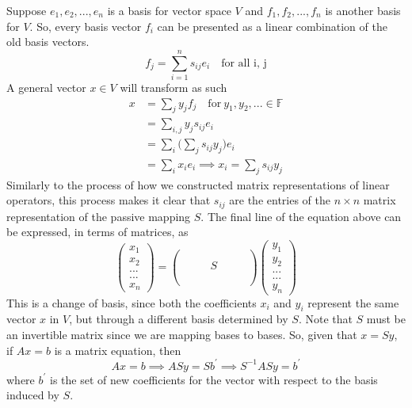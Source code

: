 \documentclass{article}
\theoremstyle{remark}
\theoremstyle{definition}
\begin{document}
    Suppose ${e_1, e_2, ..., e_n}$ is a basis for vector space $V$ and ${f_1, f_2, ..., f_n}$ is another basis for $V$. So, every basis vector $f_i$ can be presented as a linear combination of the old basis vectors. 
    \[f_j = \sum_{i =1}^{n} s_{i j} e_i \quad \text{for all i, j}\]
    A general vector $x \in V$ will transform as such
    \begin{equation} \label{eq1}
    \begin{split}
    x & = \sum_{j} y_j f_j \quad \text{for} \ y_{1}, y_{2}, ... \in \mathbb{F} \\
     & = \sum_{i,j} y_j s_{i j} e_i \\
     & = \sum_{i} \Big( \sum_{j} s_{i j} y_j \Big) e_i \\
     & = \sum_{i} x_i e_i \implies x_i = \sum_{j} s_{i j} y_j
    \end{split}
    \end{equation}
    Similarly to the process of how we constructed matrix representations of linear operators, this process makes it clear that $s_{i j}$ are the entries of the $n \times n$ matrix representation of the passive mapping $S$. The final line of the equation above can be expressed, in terms of matrices, as 
    \[\begin{pmatrix}x_1\\x_2\\...\\...\\x_n\end{pmatrix} = 
    \begin{pmatrix} \\ \\ & & & S & & &  \\\\\\\end{pmatrix} \begin{pmatrix}
    y_1\\y_2\\...\\...\\y_n\end{pmatrix} \]
    This is a change of basis, since both the coefficients $x_i$ and $y_i$ represent the same vector $x$ in $V$, but through a different basis determined by $S$. Note that $S$ must be an invertible matrix since we are mapping bases to bases. So, given that $x = S y$, if $Ax = b$ is a matrix equation, then
    \[A x = b \implies A S y = S b^\prime \implies S^{-1} A S y = b^\prime\]
    where $b^\prime$ is the set of new coefficients for the vector with respect to the basis induced by $S$. 
\end{document}
